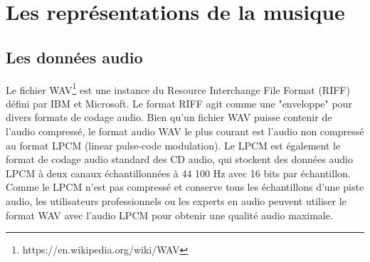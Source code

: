 \section{Les représentations de la musique}
\subsection*{Les données audio}
Le fichier WAV\footnote{https://en.wikipedia.org/wiki/WAV} est une instance du Resource Interchange File Format (RIFF) défini par IBM et Microsoft. Le format RIFF agit comme une "enveloppe" pour divers formats de codage audio.
Bien qu'un fichier WAV puisse contenir de l'audio compressé, le format audio WAV le plus courant est l'audio non compressé au format LPCM (linear pulse-code modulation). Le LPCM est également le format de codage audio standard des CD audio, qui stockent des données audio LPCM à deux canaux échantillonnées à 44 100 Hz avec 16 bits par échantillon. Comme le LPCM n'est pas compressé et conserve tous les échantillons d'une piste audio, les utilisateurs professionnels ou les experts en audio peuvent utiliser le format WAV avec l'audio LPCM pour obtenir une qualité audio maximale.
